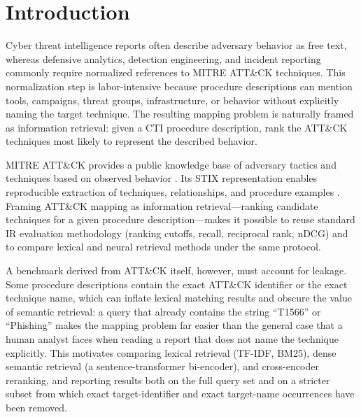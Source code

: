 \documentclass[conference]{IEEEtran}
\begin{document}
\section{Introduction}
Cyber threat intelligence reports often describe adversary behavior as free text, whereas defensive analytics, detection engineering, and incident reporting commonly require normalized references to MITRE ATT\&CK techniques. This normalization step is labor-intensive because procedure descriptions can mention tools, campaigns, threat groups, infrastructure, or behavior without explicitly naming the target technique. The resulting mapping problem is naturally framed as information retrieval: given a CTI procedure description, rank the ATT\&CK techniques most likely to represent the described behavior.

MITRE ATT\&CK provides a public knowledge base of adversary tactics and techniques based on observed behavior \cite{mitre_attack}. Its STIX representation enables reproducible extraction of techniques, relationships, and procedure examples \cite{mitre_attack_stix_data}. Framing ATT\&CK mapping as information retrieval---ranking candidate techniques for a given procedure description---makes it possible to reuse standard IR evaluation methodology (ranking cutoffs, recall, reciprocal rank, nDCG) and to compare lexical and neural retrieval methods under the same protocol.

A benchmark derived from ATT\&CK itself, however, must account for leakage. Some procedure descriptions contain the exact ATT\&CK identifier or the exact technique name, which can inflate lexical matching results and obscure the value of semantic retrieval: a query that already contains the string ``T1566'' or ``Phishing'' makes the mapping problem far easier than the general case that a human analyst faces when reading a report that does not name the technique explicitly. This motivates comparing lexical retrieval (TF-IDF, BM25), dense semantic retrieval (a sentence-transformer bi-encoder), and cross-encoder reranking, and reporting results both on the full query set and on a stricter subset from which exact target-identifier and exact target-name occurrences have been removed.
\end{document}
